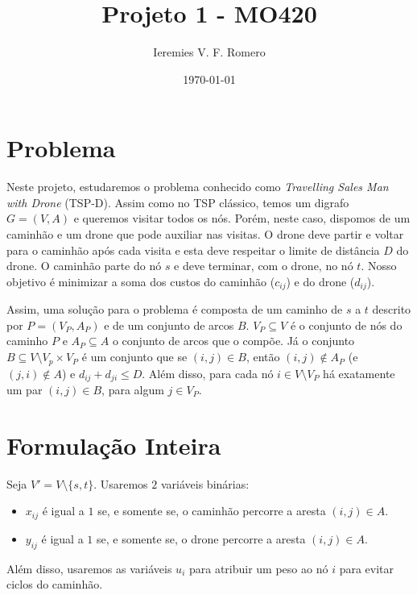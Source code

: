 \documentclass[11pt]{article}
\author{Ieremies V. F. Romero}
\date{\today}
\title{Projeto 1 - MO420}
\begin{document}
\maketitle

\section{Problema}
\label{sec:org4abcc98}
Neste projeto, estudaremos o problema conhecido como \emph{Travelling Sales Man with Drone} (TSP-D). Assim como no TSP clássico, temos um digrafo \(G = (V,A)\) e queremos visitar todos os nós. Porém, neste caso, dispomos de um caminhão e um drone que pode auxiliar nas visitas. O drone deve partir e voltar para o caminhão após cada visita e esta deve respeitar o limite de distância \(D\) do drone. O caminhão parte do nó \(s\) e deve terminar, com o drone, no nó \(t\). Nosso objetivo é minimizar a soma dos custos do caminhão (\(c_{ij}\)) e do drone (\(d_{ij}\)).

Assim, uma solução para o problema é composta de um caminho de \(s\) a \(t\) descrito por \(P = (V_P, A_P)\) e de um conjunto de arcos \(B\). \(V_P \subseteq V\) é o conjunto de nós do caminho \(P\) e \(A_P \subseteq A\) o conjunto de arcos que o compõe. Já o conjunto \(B \subseteq V \setminus V_p \times V_P\) é um conjunto que se \((i,j) \in B\), então \((i,j) \notin A_P\) (e \((j,i) \notin A\)) e \(d_{ij} + d_{ji} \leq D\). Além disso, para cada nó \(i \in V \setminus V_P\) há exatamente um par \((i,j) \in B\), para algum \(j \in V_P\).

\section{Formulação Inteira}
\label{sec:org878abad}
Seja \(V' = V \setminus \{s,t\}\). Usaremos \(2\) variáveis binárias:
\begin{itemize}
\item \(x_{ij}\) é igual a \(1\) se, e somente se, o caminhão percorre a aresta \((i,j) \in A\).
\item \(y_{ij}\) é igual a \(1\) se, e somente se, o drone percorre a aresta \((i,j) \in A\).
\end{itemize}

Além disso, usaremos as variáveis \(u_i\) para atribuir um peso ao nó \(i\) para evitar ciclos do caminhão.
\end{document}
